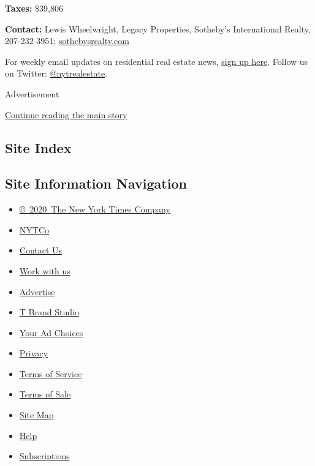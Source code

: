 \textbf{Taxes:} \$39,806

\textbf{Contact:} Lewis Wheelwright, Legacy Properties, Sotheby's
International Realty, 207-232-3951;
\href{https://www.sothebysrealty.com/eng/sales/detail/180-l-910-33wsr7/186-lopaus-point-road-tremont-me-04612}{sothebysrealty.com}

For weekly email updates on residential real estate news,
\href{http://www.nytimes.com/newsletters/realestate/}{sign up here}.
Follow us on Twitter:
\href{https://twitter.com/nytrealestate}{@nytrealestate}.

Advertisement

\protect\hyperlink{after-bottom}{Continue reading the main story}

\hypertarget{site-index}{%
\subsection{Site Index}\label{site-index}}

\hypertarget{site-information-navigation}{%
\subsection{Site Information
Navigation}\label{site-information-navigation}}

\begin{itemize}
\tightlist
\item
  \href{https://help.nytimes.com/hc/en-us/articles/115014792127-Copyright-notice}{©~2020~The
  New York Times Company}
\end{itemize}

\begin{itemize}
\tightlist
\item
  \href{https://www.nytco.com/}{NYTCo}
\item
  \href{https://help.nytimes.com/hc/en-us/articles/115015385887-Contact-Us}{Contact
  Us}
\item
  \href{https://www.nytco.com/careers/}{Work with us}
\item
  \href{https://nytmediakit.com/}{Advertise}
\item
  \href{http://www.tbrandstudio.com/}{T Brand Studio}
\item
  \href{https://www.nytimes.com/privacy/cookie-policy\#how-do-i-manage-trackers}{Your
  Ad Choices}
\item
  \href{https://www.nytimes.com/privacy}{Privacy}
\item
  \href{https://help.nytimes.com/hc/en-us/articles/115014893428-Terms-of-service}{Terms
  of Service}
\item
  \href{https://help.nytimes.com/hc/en-us/articles/115014893968-Terms-of-sale}{Terms
  of Sale}
\item
  \href{https://spiderbites.nytimes.com}{Site Map}
\item
  \href{https://help.nytimes.com/hc/en-us}{Help}
\item
  \href{https://www.nytimes.com/subscription?campaignId=37WXW}{Subscriptions}
\end{itemize}
